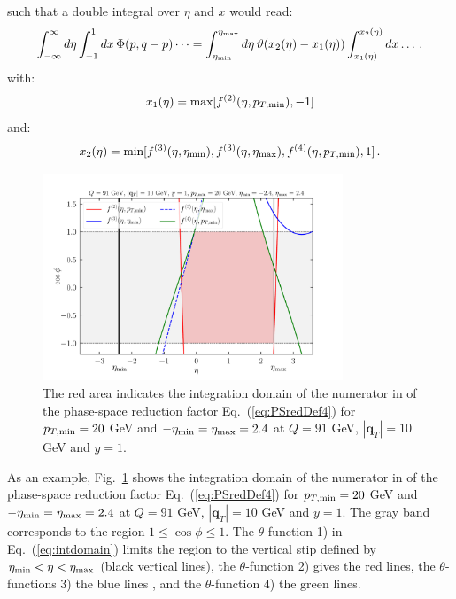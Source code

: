 \documentclass[10pt,a4paper]{article}
\begin{document}
such that a double integral over $\eta$ and $x$ would read:
\begin{equation}
\int_{-\infty}^{\infty}d\eta\int_{-1}^{1}dx\,\Phi(p,q-p)\dots =
\int_{\eta_{\rm min}}^{\eta_{\rm
    max}}d\eta\,\vartheta(x_2(\eta)-x_1(\eta))\int_{x_1(\eta)}^{x_2(\eta)}dx\dots\,.
\end{equation}
with:
\begin{equation}
x_1(\eta) = \mbox{max}[f^{(2)}(\eta,p_{T,\rm min}),-1]
\end{equation}
and:
\begin{equation}
x_2(\eta) = \mbox{min}[f^{(3)}(\eta,\eta_{\rm min}),f^{(3)}(\eta,\eta_{\rm
         max}),f^{(4)}(\eta,p_{T,\rm
         min}),1]\,.
\end{equation}

\begin{figure}[t]
  \begin{centering}
    \includegraphics[width=0.8\textwidth]{plots/IntDomain.pdf}
    \caption{The red area indicates the integration domain of the
      numerator in of the phase-space reduction factor
      Eq.~(\ref{eq:PSredDef4}) for $p_{T,\rm min}=20$ GeV and
      $-\eta_{\rm min}=\eta_{\rm max}=2.4$ at $Q=91$ GeV, $|\mathbf{q}_T|=10$ GeV and
      $y=1$.\label{fig:IntDomain}}
  \end{centering}
\end{figure}
As an example, Fig.~\ref{fig:IntDomain} shows the integration domain
of the numerator in of the phase-space reduction factor
Eq.~(\ref{eq:PSredDef4}) for $p_{T,\rm min}=20$ GeV and
$-\eta_{\rm min}=\eta_{\rm max}=2.4$ at $Q=91$ GeV,
$|\mathbf{q}_T|=10$ GeV and $y=1$.  The gray band corresponds to the
region $1\leq\cos\phi\leq 1$. The $\theta$-function 1) in
Eq.~(\ref{eq:intdomain}) limits the region to the vertical stip
defined by $\eta_{\rm min} < \eta < \eta_{\rm max}$ (black vertical
lines), the $\theta$-function 2) gives the red lines, the
$\theta$-functions 3) the blue lines , and the $\theta$-function 4)
the green lines.
\end{document}
